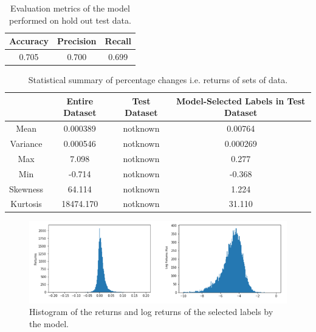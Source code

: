 \documentclass[10pt,onecolumn,letterpaper]{article}
\begin{document}
\begin{table}[hbt!]
\begin{center}
\begin{tabular}{c|c|c}
Accuracy & Precision & Recall\\
\hline
0.705 & 0.700 & 0.699\\
\end{tabular}
\end{center}
\caption{Evaluation metrics of the model performed on hold out test data.}
\end{table}


\begin{table}[hbt!]
\begin{center}
\begin{tabular}{c|c|c|c}
 & Entire Dataset & Test Dataset & Model-Selected Labels in Test Dataset\\
\hline
Mean & 0.000389 & notknown & 0.00764\\
\hline
Variance & 0.000546 & notknown & 0.000269\\
\hline
Max & 7.098 & notknown & 0.277\\
\hline
Min & -0.714 & notknown & -0.368\\
\hline
Skewness & 64.114 & notknown & 1.224\\
\hline
Kurtosis & 18474.170 & notknown & 31.110\\
\end{tabular}
\end{center}
\caption{Statistical summary of percentage changes i.e. returns of sets of data.}
\end{table}

\begin{figure}[!hbt!]
\centering
\includegraphics[width=16.5cm]{results_distributions.png}
\caption{Histogram of the returns and log returns of the selected labels by the model.}
\end{figure}


\newpage


\newpage
\end{document}
